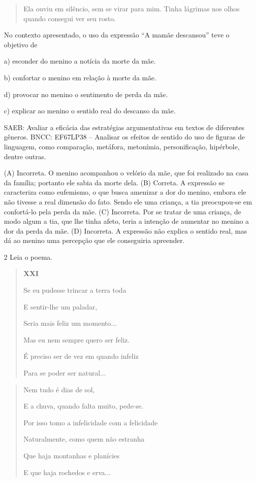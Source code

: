 \begin{quote}
Ela ouviu em silêncio, sem se virar para mim. Tinha lágrimas nos olhos
quando consegui ver seu rosto.
\end{quote}


No contexto apresentado, o uso da expressão ``A mamãe descansou'' teve o
objetivo de

a) esconder do menino a notícia da morte da mãe.

b) confortar o menino em relação à morte da mãe.

d) provocar no menino o sentimento de perda da mãe.

c) explicar ao menino o sentido real do descanso da mãe.

SAEB: Avaliar a eficácia das estratégias argumentativas em textos de
diferentes gêneros. BNCC: EF67LP38 -- Analisar os efeitos de sentido do
uso de figuras de linguagem, como comparação, metáfora, metonímia,
personificação, hipérbole, dentre outras.

(A) Incorreta. O menino acompanhou o velório da mãe, que foi realizado
na casa da família; portanto ele sabia da morte dela. (B) Correta. A
expressão se caracteriza como eufemismo, o que busca amenizar a dor do
menino, embora ele não tivesse a real dimensão do fato. Sendo ele uma
criança, a tia preocupou-se em confortá-lo pela perda da mãe. (C)
Incorreta. Por se tratar de uma criança, de modo algum a tia, que lhe
tinha afeto, teria a intenção de aumentar no menino a dor da perda da
mãe. (D) Incorreta. A expressão não explica o sentido real, mas dá ao
menino uma percepção que ele conseguiria apreender.

\num{2} Leia o poema.

\begin{quote}
\textbf{XXI}

Se eu pudesse trincar a terra toda

E sentir-lhe um paladar,

Seria mais feliz um momento...

Mas eu nem sempre quero ser feliz.

É preciso ser de vez em quando infeliz

Para se poder ser natural...
\end{quote}

\begin{quote}
Nem tudo é dias de sol,

E a chuva, quando falta muito, pede-se.

Por isso tomo a infelicidade com a felicidade

Naturalmente, como quem não estranha

Que haja montanhas e planícies

E que haja rochedos e erva...
\end{quote}

